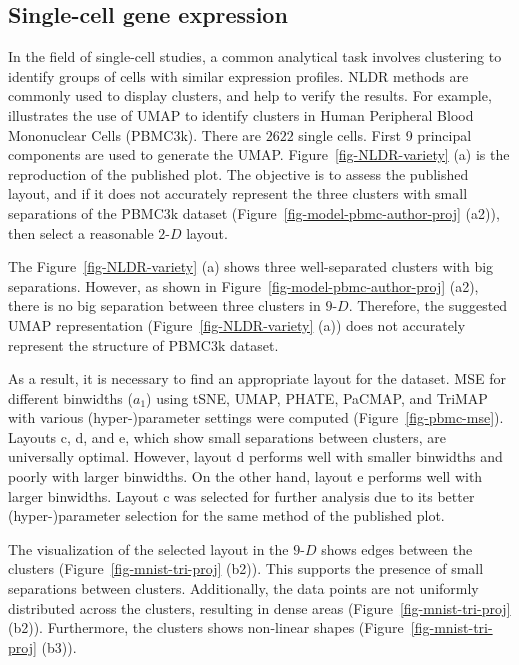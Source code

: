 \documentclass[
  12pt]{article}
\newcommand\gD{$2\text{-}D$}
\begin{document}
\subsection{Single-cell gene
expression}\label{single-cell-gene-expression}

In the field of single-cell studies, a common analytical task involves
clustering to identify groups of cells with similar expression profiles.
NLDR methods are commonly used to display clusters, and help to verify
the results. For example, \citet{chen2023} illustrates the use of UMAP
to identify clusters in Human Peripheral Blood Mononuclear Cells
(PBMC3k). There are \(2622\) single cells. First 9 principal components
are used to generate the UMAP. Figure~\ref{fig-NLDR-variety} (a) is the
reproduction of the published plot. The objective is to assess the
published layout, and if it does not accurately represent the three
clusters with small separations of the PBMC3k dataset
(Figure~\ref{fig-model-pbmc-author-proj} (a2)), then select a reasonable
\gD{} layout.

The Figure~\ref{fig-NLDR-variety} (a) shows three well-separated
clusters with big separations. However, as shown in
Figure~\ref{fig-model-pbmc-author-proj} (a2), there is no big separation
between three clusters in \(9\text{-}D\). Therefore, the suggested UMAP
representation (Figure~\ref{fig-NLDR-variety} (a)) does not accurately
represent the structure of PBMC3k dataset.

As a result, it is necessary to find an appropriate layout for the
dataset. MSE for different binwidths (\(a_1\)) using tSNE, UMAP, PHATE,
PaCMAP, and TriMAP with various (hyper-)parameter settings were computed
(Figure~\ref{fig-pbmc-mse}). Layouts c, d, and e, which show small
separations between clusters, are universally optimal. However, layout d
performs well with smaller binwidths and poorly with larger binwidths.
On the other hand, layout e performs well with larger binwidths. Layout
c was selected for further analysis due to its better (hyper-)parameter
selection for the same method of the published plot.

The visualization of the selected layout in the \(9\text{-}D\) shows
edges between the clusters (Figure~\ref{fig-mnist-tri-proj} (b2)). This
supports the presence of small separations between clusters.
Additionally, the data points are not uniformly distributed across the
clusters, resulting in dense areas (Figure~\ref{fig-mnist-tri-proj}
(b2)). Furthermore, the clusters shows non-linear shapes
(Figure~\ref{fig-mnist-tri-proj} (b3)).
\end{document}
